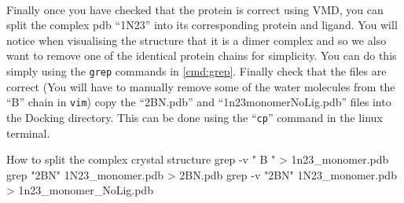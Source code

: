     \paragraph{}
        Finally once you have checked that the protein is correct using VMD, you can split the complex pdb \enquote{1N23} into its corresponding protein and ligand. You will notice when visualising the structure that it is a dimer complex and so we also want to remove one of the identical protein chains for simplicity. You can do this simply using the \texttt{grep} commands in \cref{cmd:grep}.  Finally check that the files are correct (You will have to manually remove some of the water molecules from the \enquote{B} chain in \texttt{vim}) copy the \enquote{2BN.pdb} and \enquote{1n23\textunderscore monomer\textunderscore NoLig.pdb} files into the Docking directory. This can be done using the \enquote{\texttt{cp}} command in the linux terminal. 

    \begin{bashcmd}[label=cmd:grep]{How to split the complex crystal structure}
    grep -v " B " > 1n23_monomer.pdb
    grep "2BN" 1N23_monomer.pdb > 2BN.pdb
    grep -v "2BN" 1N23_monomer.pdb > 1n23_monomer_NoLig.pdb        
    \end{bashcmd}
    